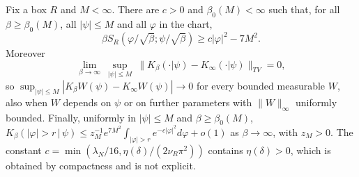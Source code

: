 \begin{theorem}\label{pf:thm-L3}
Fix a box $R$ and $M<\infty$. There are $c>0$ and $\beta_0(M)<\infty$ such that, for all $\beta\ge\beta_0(M)$, all $|\psi|\le M$ and all $\varphi$ in the chart,
\begin{equation}\label{pf:eq-lower}
\beta S_R(\varphi/\sqrt\beta;\psi/\sqrt\beta)\ge c|\varphi|^2-7M^2 .
\end{equation}
Moreover
\[
\lim_{\beta\to\infty}\ \sup_{|\psi|\le M}\ \big\|K_\beta(\cdot|\psi)-K_\infty(\cdot|\psi)\big\|_{TV}=0,
\]
so $\sup_{|\psi|\le M}|K_\beta W(\psi)-K_\infty W(\psi)|\to0$ for every bounded measurable $W$, also when $W$ depends on $\psi$ or on further parameters with $\|W\|_\infty$ uniformly bounded. Finally, uniformly in $|\psi|\le M$ and $\beta\ge\beta_0(M)$, $K_\beta(|\varphi|>r\,|\,\psi)\le z_M^{-1}e^{7M^2}\int_{|\varphi|>r}e^{-c|\varphi|^2}d\varphi+o(1)$ as $\beta\to\infty$, with $z_M>0$.
The constant $c=\min(\lambda_N/16,\eta(\delta)/(2\nu_R\pi^2))$ contains $\eta(\delta)>0$, which is obtained by compactness and is not explicit.
\end{theorem}

